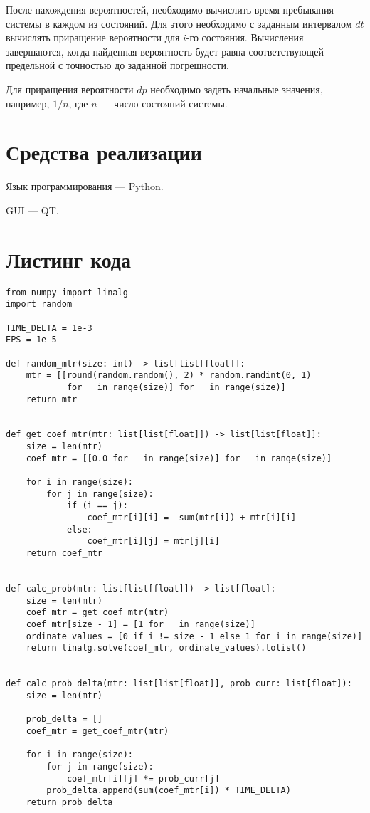 После нахождения вероятностей, необходимо вычислить время пребывания системы в каждом из состояний. Для этого необходимо с заданным интервалом $dt$ вычислять приращение вероятности для $i$-го состояния. Вычисления завершаются, когда найденная вероятность будет равна соответствующей предельной с точностью до заданной погрешности.

Для приращения вероятности $dp$ необходимо задать начальные значения, например, $1/n$, где $n$ --- число состояний системы.

\section*{Средства реализации}

Язык программирования --- Python.

GUI --- QT.

\clearpage

\section*{Листинг кода}

\begin{lstlisting}
from numpy import linalg
import random

TIME_DELTA = 1e-3
EPS = 1e-5

def random_mtr(size: int) -> list[list[float]]:
	mtr = [[round(random.random(), 2) * random.randint(0, 1)
			for _ in range(size)] for _ in range(size)]
	return mtr


def get_coef_mtr(mtr: list[list[float]]) -> list[list[float]]:
	size = len(mtr)
	coef_mtr = [[0.0 for _ in range(size)] for _ in range(size)]
	
	for i in range(size):
		for j in range(size):
			if (i == j):
				coef_mtr[i][i] = -sum(mtr[i]) + mtr[i][i]
			else:
				coef_mtr[i][j] = mtr[j][i]
	return coef_mtr


def calc_prob(mtr: list[list[float]]) -> list[float]:
	size = len(mtr)
	coef_mtr = get_coef_mtr(mtr)
	coef_mtr[size - 1] = [1 for _ in range(size)]
	ordinate_values = [0 if i != size - 1 else 1 for i in range(size)]
	return linalg.solve(coef_mtr, ordinate_values).tolist()


def calc_prob_delta(mtr: list[list[float]], prob_curr: list[float]):
	size = len(mtr)
	
	prob_delta = []
	coef_mtr = get_coef_mtr(mtr)
	
	for i in range(size):
		for j in range(size):
			coef_mtr[i][j] *= prob_curr[j]
		prob_delta.append(sum(coef_mtr[i]) * TIME_DELTA)
	return prob_delta
\end{lstlisting}

